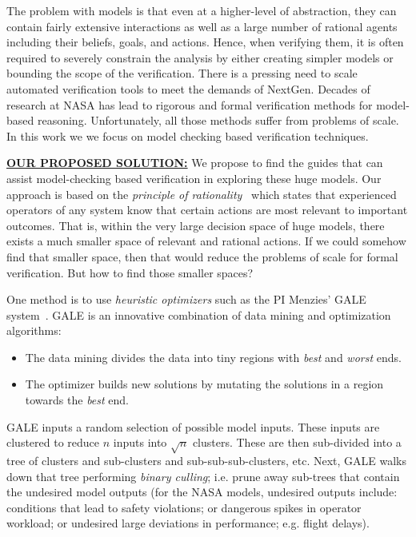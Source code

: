 \documentclass[12pt]{article}
\newcommand{\bi}{\begin{itemize}[leftmargin=0.4cm]}
\newcommand{\ei}{\end{itemize}}
\begin{document}
The problem with models is that even at a higher-level of abstraction, they can contain fairly extensive interactions as well as a large number of rational agents including their beliefs, goals, and actions. Hence, when verifying them, it is often required to severely constrain the analysis by either creating simpler models or bounding the scope of the verification.
There is a pressing need to scale automated verification tools to meet the demands of NextGen. Decades of research at NASA has lead to rigorous and formal verification methods for model-based reasoning. Unfortunately, all those methods suffer from problems of scale. In this work we we focus on model checking based verification techniques.

\noindent
\underline{{\bf OUR PROPOSED SOLUTION:}} We propose to find the guides
that can assist model-checking based verification in exploring these huge models. Our approach is based on the  {\em principle of rationality}~\cite{Newell88} which states that experienced operators of any system know that certain actions are most relevant to important outcomes. That is, within the very large decision space of huge models, there exists a much smaller space of relevant and rational actions. If we could somehow find that smaller space, then that would reduce the problems of scale for formal verification. But how to find those smaller spaces?

One method is to use {\em  heuristic optimizers} such as the PI Menzies' GALE system~\cite{krall2015gale}.  GALE
is an innovative combination of data mining and 
optimization algorithms:
\bi
\item
The data mining divides the data into tiny regions
with {\em best} and {\em worst} ends.
\item
The optimizer builds new solutions by mutating  the solutions
in a region towards the {\em best} end.
\ei
GALE inputs a random selection of possible model inputs. These
 inputs are clustered to   reduce  $n$ inputs into $\sqrt{n}$ clusters.
 These are then sub-divided into a tree of clusters and sub-clusters and sub-sub-sub-clusters, etc. Next, GALE walks down that tree performing {\em binary culling};
 i.e. prune away sub-trees that contain the undesired model outputs (for the NASA models,
 undesired outputs include: conditions that lead to safety violations; or dangerous spikes in operator workload; or undesired large deviations in performance; e.g. flight delays).
\end{document}
